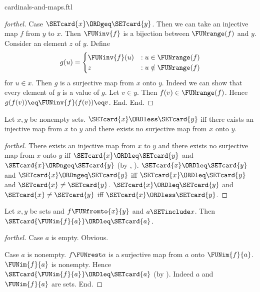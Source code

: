 \documentclass{naproche-library}
\begin{document}
\begin{smodule}[title=Cardinal Numbers and Maps]{cardinals-and-maps.ftl}
\begin{proof}[forthel]
  Case $\SETcard{x} \ORDgeq \SETcard{y}$.
    Then we can take an injective map $f$ from $y$ to $x$.
    Then $\FUNinv{f}$ is a bijection between $\FUNrange(f)$ and $y$.
    Consider an element $z$ of $y$.
    Define \[ g(u) =
      \begin{cases}
        \FUNinv{f}(u) & : u \in \FUNrange(f) \\
        z         & : u \notin \FUNrange(f)
      \end{cases} \]
    for $u \in x$.
    Then $g$ is a surjective map from $x$ onto $y$.
    Indeed we can show that every element of $y$ is a value of $g$.
      Let $v \in y$.
      Then $f(v) \in \FUNrange(f)$.
      Hence $g(f(v)) \eq \FUNinv{f}(f(v)) \eq v$.
    End.
  End.
\end{proof}

\begin{proposition}[forthel,id=SET_THEORY_06_5843717288099840]
  Let $x, y$ be nonempty sets.
  $\SETcard{x} \ORDless \SETcard{y}$ iff there exists an injective map from $x$ to $y$ and there exists no surjective map from $x$ onto $y$.
\end{proposition}
\begin{proof}[forthel]
  There exists an injective map from $x$ to $y$ and there exists no surjective map from $x$ onto $y$ iff $\SETcard{x} \ORDleq \SETcard{y}$ and $\SETcard{x} \ORDngeq \SETcard{y}$ (by , ).
  $\SETcard{x} \ORDleq \SETcard{y}$ and $\SETcard{x} \ORDngeq \SETcard{y}$ iff $\SETcard{x} \ORDleq \SETcard{y}$ and $\SETcard{x} \neq \SETcard{y}$.
  $\SETcard{x} \ORDleq \SETcard{y}$ and $\SETcard{x} \neq \SETcard{y}$ iff $\SETcard{x} \ORDless \SETcard{y}$.
\end{proof}

\begin{proposition}[forthel,id=SET_THEORY_06_8113916590686208]
  Let $x, y$ be sets and $f \FUNfromto{x}{y}$ and $a \SETinclude x$.
  Then $\SETcard{\FUNim{f}{a}} \ORDleq \SETcard{a}$.
\end{proposition}
\begin{proof}[forthel]
  Case $a$ is empty. Obvious.

  Case $a$ is nonempty.
    $f \FUNrest a$ is a surjective map from $a$ onto $\FUNim{f}{a}$.
    $\FUNim{f}{a}$ is nonempty.
    Hence $\SETcard{\FUNim{f}{a}} \ORDleq \SETcard{a}$ (by ).
    Indeed $a$ and $\FUNim{f}{a}$ are sets.
  End.
\end{proof}
\end{smodule}
\end{document}
